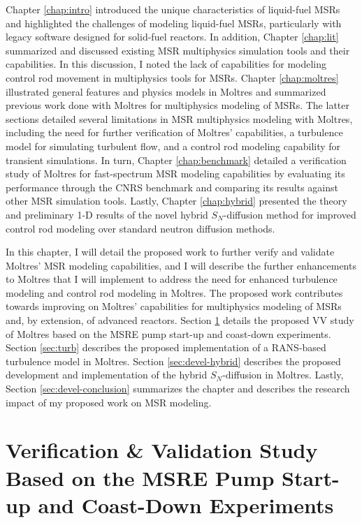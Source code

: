 Chapter \ref{chap:intro} introduced the unique characteristics of liquid-fuel
\glspl{MSR}
and highlighted the challenges of modeling liquid-fuel \glspl{MSR}, particularly
with legacy software designed for solid-fuel reactors. In addition, Chapter
\ref{chap:lit} summarized and discussed existing \gls{MSR} multiphysics simulation tools and
their capabilities. In this discussion, I noted the lack of capabilities for modeling control rod
movement in multiphysics tools for \glspl{MSR}. Chapter \ref{chap:moltres} illustrated general
features and physics models in Moltres and summarized previous work done with
Moltres for multiphysics modeling of \glspl{MSR}. The latter sections detailed
several limitations in \gls{MSR} multiphysics modeling with
Moltres, including the need for further verification of
Moltres' capabilities, a turbulence model for simulating turbulent flow, and a
control rod modeling capability for transient simulations. In turn,
Chapter \ref{chap:benchmark} detailed a verification study of Moltres for fast-spectrum
\gls{MSR} modeling capabilities by evaluating its performance
through the CNRS benchmark and comparing its results against other
\gls{MSR} simulation tools. Lastly, Chapter \ref{chap:hybrid} presented the theory and preliminary
1-D results of the novel hybrid $S_N$-diffusion method for improved control rod modeling over
standard neutron diffusion methods.

In this chapter, I will detail the proposed work to further verify and validate Moltres' \gls{MSR}
modeling capabilities, and I will describe the further enhancements to Moltres that I will
implement to address the
need for enhanced turbulence modeling and control rod modeling in Moltres. The
proposed work contributes towards improving on Moltres' capabilities for
multiphysics modeling of \glspl{MSR} and, by extension, of advanced reactors.
Section \ref{sec:vv-study} details the proposed \gls{VV} study of Moltres based on the \gls{MSRE}
pump start-up and coast-down experiments. Section \ref{sec:turb} describes the proposed
implementation of a \gls{RANS}-based turbulence model in Moltres. Section \ref{sec:devel-hybrid}
describes the proposed development and implementation of the hybrid $S_N$-diffusion in Moltres.
Lastly, Section \ref{sec:devel-conclusion} summarizes the chapter and describes the research impact
of my proposed work on \gls{MSR} modeling.

\section{Verification \& Validation Study Based on the MSRE Pump Start-up and Coast-Down
Experiments} \label{sec:vv-study}

